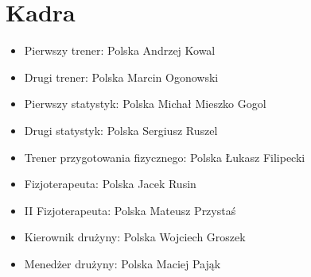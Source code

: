 \documentclass{article}
\begin{document}
\section{Kadra}
\begin{itemize}
\item Pierwszy trener: Polska Andrzej Kowal
\item Drugi trener: Polska Marcin Ogonowski
\item Pierwszy statystyk: Polska Michał Mieszko Gogol
\item Drugi statystyk: Polska Sergiusz Ruszel
\item Trener przygotowania fizycznego: Polska Łukasz Filipecki
\item Fizjoterapeuta: Polska Jacek Rusin
\item II Fizjoterapeuta: Polska Mateusz Przystaś
\item Kierownik drużyny: Polska Wojciech Groszek
\item Menedżer drużyny: Polska Maciej Pająk
\end{itemize}
\end{document}
